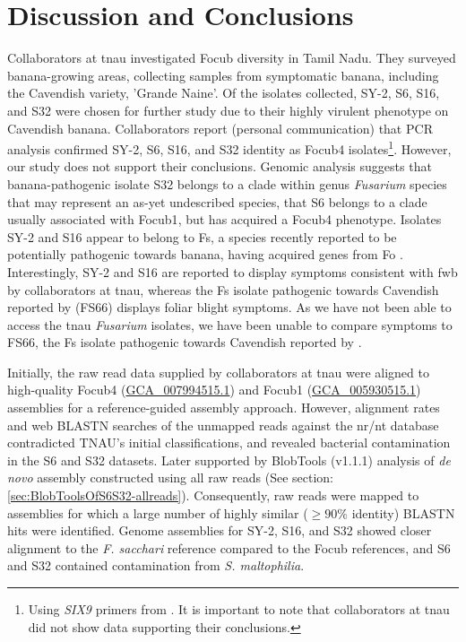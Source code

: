 \section{Discussion and Conclusions}

Collaborators at \ac{tnau} investigated \ac{Focub} diversity in Tamil Nadu. They surveyed banana-growing areas, collecting samples from symptomatic banana, including the Cavendish variety, 'Grande Naine'. Of the isolates collected, SY-2, S6, S16, and S32 were chosen for further study due to their highly virulent phenotype on Cavendish banana. Collaborators report (personal communication) that \ac{PCR} analysis confirmed SY-2, S6, S16, and S32 identity as \ac{Focub4} isolates\footnote{Using \textit{SIX9} primers from \textcite{Carvalhais2019}. It is important to note that collaborators at \ac{tnau} did not show data supporting their conclusions.}. However, our study does not support their conclusions. Genomic analysis suggests that banana-pathogenic isolate S32 belongs to a clade within genus \textit{Fusarium} species that may represent an as-yet undescribed species, that S6 belongs to a clade usually associated with \ac{Focub1}, but has acquired a \ac{Focub4} phenotype. Isolates SY-2 and S16 appear to belong to \ac{Fs}, a species recently reported to be potentially pathogenic towards banana, having acquired genes from \ac{Fo} \parencite{Cui2021}. Interestingly, SY-2 and S16 are reported to display symptoms consistent with \ac{fwb} by collaborators at \ac{tnau}, whereas the \ac{Fs} isolate pathogenic towards Cavendish reported by \textcite{Cui2021} (FS66) displays foliar blight symptoms. As we have not been able to access the \ac{tnau} \textit{Fusarium} isolates, we have been unable to compare symptoms to FS66, the \ac{Fs} isolate pathogenic towards Cavendish reported by \textcite{Cui2021}. 

Initially, the raw read data supplied by collaborators at \ac{tnau} were aligned to high-quality \ac{Focub4} (\href{https://www.ncbi.nlm.nih.gov/datasets/genome/GCA_007994515.1/}{GCA\_007994515.1}) and \ac{Focub1} (\href{https://www.ncbi.nlm.nih.gov/datasets/genome/GCA_005930515.1/}{GCA\_005930515.1})  assemblies for a reference-guided assembly approach. However, alignment rates and web BLASTN searches of the unmapped reads against the nr/nt database contradicted TNAU's initial classifications, and revealed bacterial contamination in the S6 and S32 datasets. Later supported by BlobTools (v1.1.1) analysis of \textit{de novo} assembly constructed using all raw reads (See section: \ref{sec:BlobToolsOfS6S32-allreads}). Consequently, raw reads were  mapped to assemblies for which a large number of highly similar ($ \geq90\% $ identity) BLASTN hits were identified. Genome assemblies for SY-2, S16, and S32 showed closer alignment to the \textit{F. sacchari} reference compared to the \ac{Focub} references, and S6 and S32 contained contamination from \textit{S. maltophilia}. 

